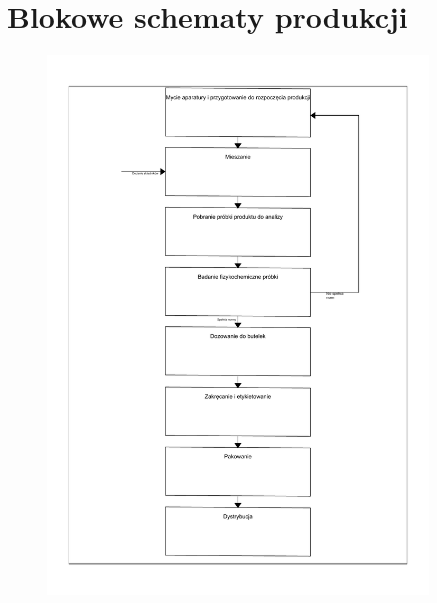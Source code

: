 \section{Blokowe schematy produkcji}

\begin{figure}[H]
	\centering
	\includegraphics[width=0.9\textwidth]{./sec5/Schemat-blokowy-produkcji-Model.pdf}
\end{figure}
